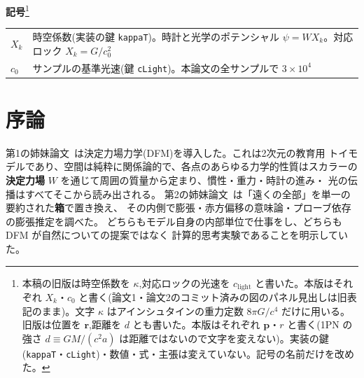 \documentclass[a4paper,10pt,twocolumn]{ltjsarticle}
\begin{document}
\begin{abstract}
パラメータはゼロ---ガリレオ衛星4個すべてが $20$ イオ公転の窓で観測恒星周期の
$0.051\%$ 以内に留まり、$q=3$ 対照は4個中2個を事前登録の $\pm1\%$ から外す。
これらの周期は転写された値であって予言ではなく、また結果は強減衰の族
$q\gtrsim8$ の全体にわたって($q=8$〜$14$ で鈍感であることが実測されている)
不変であるから、この走行は qLock 閉形式の検証ではなく、$q=3$ と飽和した
高qクラスとを区別する\textbf{ストレステスト}であり、そこで生き残るのは規則が返す
特定の値ではなく\textbf{その指数のクラス}である。
ソース依存性の変種により、この結論がガリレオ衛星の周期をどの表から採るかに
依存しないことも確かめてある。
規約を生んだ失敗は結果として報告し、較正一致が許可する以上のことは主張しない:
数値の一致は機構の同定ではない。
\end{abstract}

\noindent\textbf{記号}\footnote{本稿の旧版は時空係数を $\kappa$,対応ロックの光速を $c_{\mathrm{light}}$ と書いた。本版はそれぞれ $X_k$・$c_0$ と書く(論文1・論文2のコミット済みの図のパネル見出しは旧表記のまま)。文字 $\kappa$ はアインシュタインの重力定数 $8\pi G/c^{4}$ だけに用いる。旧版は位置を $\bm r$,距離を $d$ とも書いた。本版はそれぞれ $\bm p$・$r$ と書く(1PN の強さ $d\equiv GM/(c^{2}a)$ は距離ではないので文字を変えない)。実装の鍵(\texttt{kappaT}・\texttt{cLight})・数値・式・主張は変えていない。記号の名前だけを改めた。}
\begin{center}
\small
\begin{tabular}{@{}lp{}@{}}
\hline
$X_k$ & 時空係数(実装の鍵 \texttt{kappaT})。時計と光学のポテンシャル $\psi = W X_k$。対応ロック $X_k = G/c_0^{2}$ \\
$c_0$ & サンプルの基準光速(鍵 \texttt{cLight})。本論文の全サンプルで $3\times10^{4}$ \\
\hline
\end{tabular}
\end{center}

\section{序論}
\label{sec:intro}

第1の姉妹論文~\cite{DFM1}は決定力場力学(DFM)を導入した。これは2次元の教育用
トイモデルであり、空間は純粋に関係論的で、各点のあらゆる力学的性質はスカラーの
\textbf{決定力場} $W$ を通じて周囲の質量から定まり、慣性・重力・時計の進み・
光の伝播はすべてそこから読み出される。
第2の姉妹論文~\cite{DFM2}は「遠くの全部」を単一の要約された\textbf{箱}で置き換え、
その内側で膨張・赤方偏移の意味論・プローブ依存の膨張推定を調べた。
どちらもモデル自身の内部単位で仕事をし、どちらも DFM が自然についての提案ではなく
計算的思考実験であることを明示していた。
\end{document}
